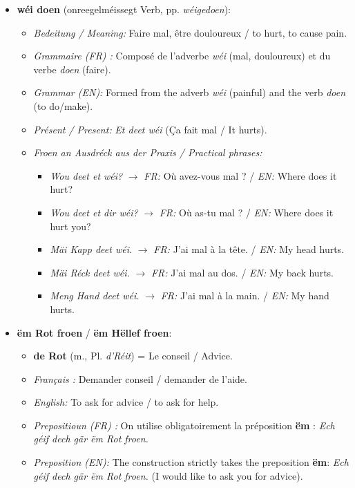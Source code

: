 \begin{itemize}
    \item \textbf{wéi doen} (onreegelméissegt Verb, pp. \textit{wéigedoen}):
    \begin{itemize}
        \item \textit{Bedeitung / Meaning:} Faire mal, être douloureux / to hurt, to cause pain.
        \item \textit{Grammaire (FR) :} Composé de l'adverbe \textit{wéi} (mal, douloureux) et du verbe \textit{doen} (faire).
        \item \textit{Grammar (EN):} Formed from the adverb \textit{wéi} (painful) and the verb \textit{doen} (to do/make).
        \item \textit{Présent / Present:} \textit{Et deet wéi} (Ça fait mal / It hurts).
        \item \textit{Froen an Ausdréck aus der Praxis / Practical phrases:}
        \begin{itemize}
            \item \textit{Wou deet et wéi?} $\rightarrow$ \textit{FR:} Où avez-vous mal ? / \textit{EN:} Where does it hurt?
            \item \textit{Wou deet et dir wéi?} $\rightarrow$ \textit{FR:} Où as-tu mal ? / \textit{EN:} Where does it hurt you?
            \item \textit{Mäi Kapp deet wéi.} $\rightarrow$ \textit{FR:} J'ai mal à la tête. / \textit{EN:} My head hurts.
            \item \textit{Mäi Réck deet wéi.} $\rightarrow$ \textit{FR:} J'ai mal au dos. / \textit{EN:} My back hurts.
            \item \textit{Meng Hand deet wéi.} $\rightarrow$ \textit{FR:} J'ai mal à la main. / \textit{EN:} My hand hurts.
        \end{itemize}
    \end{itemize}

    \vspace{0.6em}

    \item \textbf{ëm Rot froen} / \textbf{ëm Hëllef froen}:
    \begin{itemize}
        \item \textbf{de Rot} (m., Pl. \textit{d'Réit}) = Le conseil / Advice.
        \item \textit{Français :} Demander conseil / demander de l'aide.
        \item \textit{English:} To ask for advice / to ask for help.
        \item \textit{Prepositioun (FR) :} On utilise obligatoirement la préposition \textbf{ëm} : \textit{Ech géif dech gär ëm Rot froen.}
        \item \textit{Preposition (EN):} The construction strictly takes the preposition \textbf{ëm}: \textit{Ech géif dech gär ëm Rot froen.} (I would like to ask you for advice).
    \end{itemize}


\end{itemize}
